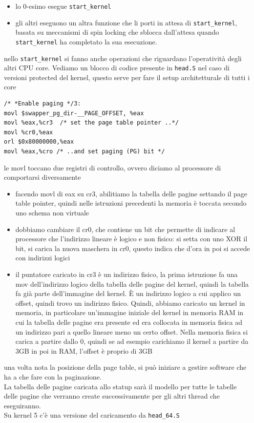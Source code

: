 \documentclass[12pt, oneside]{extbook}
\begin{document}
\begin{itemize}
\item lo 0-esimo esegue \texttt{start\_kernel}
\item gli altri eseguono un altra funzione che li porti in attesa di \texttt{start\_kernel}, basata su meccanismi di spin locking che sblocca dall'attesa quando \texttt{start\_kernel} ha completato la sua esecuzione.
\end{itemize}
nello \texttt{start\_kernel} si fanno anche operazioni che riguardano l'operatività degli altri CPU core. Vediamo un blocco di codice presente in \texttt{head.S} nel caso di versioni protected del kernel, questo serve per fare il setup architetturale di tutti i core
\begin{lstlisting}
/* *Enable paging */3:
movl $swapper_pg_dir-__PAGE_OFFSET, %eax
movl %eax,%cr3	/* set the page table pointer ..*/
movl %cr0,%eax
orl $0x80000000,%eax
movl %eax,%cro /* ..and set paging (PG) bit */
\end{lstlisting}
le movl toccano due registri di controllo, ovvero diciamo al processore di comportarsi diversamente
\begin{itemize}
\item facendo movl di eax su cr3, abilitiamo la tabella delle pagine settando il page table pointer, quindi nelle istruzioni precedenti la memoria è toccata secondo uno schema non virtuale
\item dobbiamo cambiare il cr0, che contiene un bit che permette di indicare al processore che l'indirizzo lineare è logico e non fisico: si setta con uno XOR il bit, si carica la nuova maschera in cr0, questo indica che d'ora in poi si accede con indirizzi logici
\item il puntatore caricato in cr3 è un indirizzo fisico, la prima istruzione fa una mov dell'indirizzo logico della tabella delle pagine del kernel, quindi la tabella fa già parte dell'immagine del kernel. È un indirizzo logico a cui applico un offset, quindi trovo un indirizzo fisico. Quindi, abbiamo caricato un kernel in memoria, in particolare un'immagine iniziale del kernel in memoria RAM in cui la tabella delle pagine era presente ed era collocata in memoria fisica ad un indirizzo pari a quello lineare meno un certo offset. Nella memoria fisica si carica a partire dallo 0, quindi se ad esempio carichiamo il kernel a partire da 3GB in poi in RAM, l'offset è proprio di 3GB
\end{itemize}
una volta nota la posizione della page table, si può iniziare a gestire software che ha a che fare con la paginazione.\\ La tabella delle pagine caricata allo statup sarà il modello per tutte le tabelle delle pagine che verranno create successivamente per gli altri thread che eseguiranno.\\ Su kernel 5 c'è una versione del caricamento da \texttt{head\_64.S}
\end{document}
